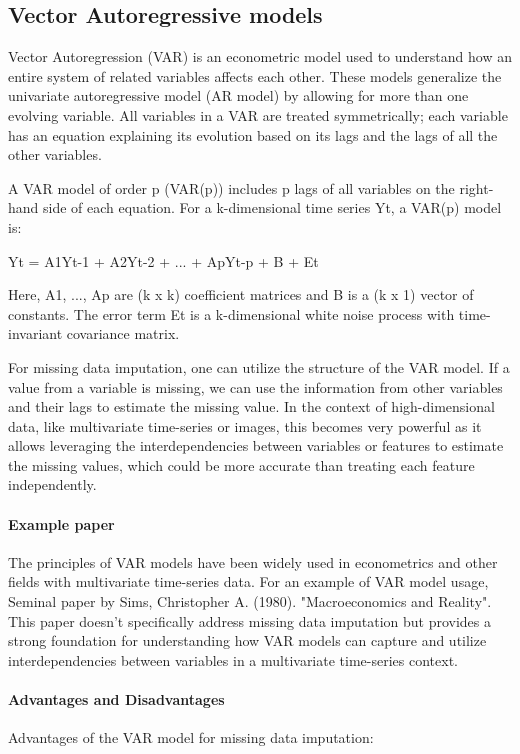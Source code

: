 \documentclass[a4paper,12pt,twoside,openright]{report}
\begin{document}
\subsection{Vector Autoregressive models}

Vector Autoregression (VAR) is an econometric model used to understand how an entire system of related variables affects each other. These models generalize the univariate autoregressive model (AR model) by allowing for more than one evolving variable. All variables in a VAR are treated symmetrically; each variable has an equation explaining its evolution based on its lags and the lags of all the other variables.

A VAR model of order p (VAR(p)) includes p lags of all variables on the right-hand side of each equation. For a k-dimensional time series {Yt}, a VAR(p) model is:

Yt = A1Yt-1 + A2Yt-2 + ... + ApYt-p + B + Et

Here, A1, ..., Ap are (k x k) coefficient matrices and B is a (k x 1) vector of constants. The error term Et is a k-dimensional white noise process with time-invariant covariance matrix.

For missing data imputation, one can utilize the structure of the VAR model. If a value from a variable is missing, we can use the information from other variables and their lags to estimate the missing value. In the context of high-dimensional data, like multivariate time-series or images, this becomes very powerful as it allows leveraging the interdependencies between variables or features to estimate the missing values, which could be more accurate than treating each feature independently.

\paragraph{Example paper} The principles of VAR models have been widely used in econometrics and other fields with multivariate time-series data. For an example of VAR model usage, Seminal paper by Sims, Christopher A. (1980). "Macroeconomics and Reality". This paper doesn't specifically address missing data imputation but provides a strong foundation for understanding how VAR models can capture and utilize interdependencies between variables in a multivariate time-series context.

\paragraph{Advantages and Disadvantages} Advantages of the VAR model for missing data imputation:
\end{document}
